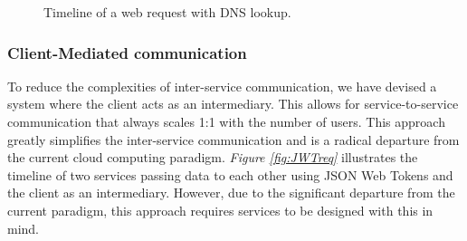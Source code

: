 \documentclass[12pt]{article}
\begin{document}
\begin{figure}[h]
    \caption{Timeline of a web request with DNS lookup.}
    \label{fig:TL}
\end{figure}

\newpage

\subsubsection{Client-Mediated communication}
To reduce the complexities of inter-service communication, we have devised a system where the client acts as an intermediary.
This allows for service-to-service communication that always scales 1:1 with the number of users.  
This approach greatly simplifies the inter-service communication and is a radical departure from the current cloud computing paradigm.
\textit{Figure \ref{fig:JWTreq}} illustrates the timeline of two services passing data to each other using JSON Web Tokens and the client as an intermediary.
However, due to the significant departure from the current paradigm, this approach requires services to be designed with this in mind.
\end{document}
